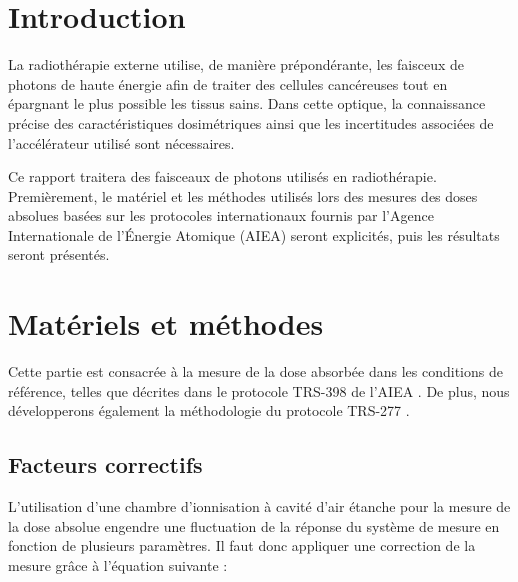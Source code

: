 \documentclass{article}
\begin{document}




\onehalfspacing

\pagestyle{fancy}
	\renewcommand\headrulewidth{0.5pt}
	\renewcommand\footrulewidth{0.5pt}
	\fancyfoot[R]{\thepage}

\tableofcontents
\clearpage
\section{Introduction}

La radiothérapie externe utilise, de manière prépondérante, les faisceux de photons de haute énergie afin de traiter des cellules cancéreuses tout en épargnant le plus possible les tissus sains. Dans cette optique, la connaissance précise des caractéristiques dosimétriques ainsi que les incertitudes associées de l'accélérateur utilisé sont nécessaires. 

Ce rapport traitera des faisceaux de photons utilisés en radiothérapie. Premièrement, le matériel et les méthodes utilisés lors des mesures des doses absolues basées sur les protocoles internationaux fournis par l'Agence Internationale de l'Énergie Atomique (AIEA) seront explicités, puis les résultats seront présentés. 

\section{Matériels et méthodes}

Cette partie est consacrée à la mesure de la dose absorbée dans les conditions de référence, telles que décrites dans le protocole TRS-398 de l'AIEA \cite{international2001iaea}. De plus, nous développerons également la méthodologie du protocole TRS-277 \cite{internationaliaea}.

\subsection{Facteurs correctifs}

L'utilisation d'une chambre d'ionnisation à cavité d'air étanche pour la mesure de la dose absolue engendre une fluctuation de la réponse du système de mesure en fonction de plusieurs paramètres. Il faut donc appliquer une correction de la mesure grâce à l'équation suivante :
\end{document}
